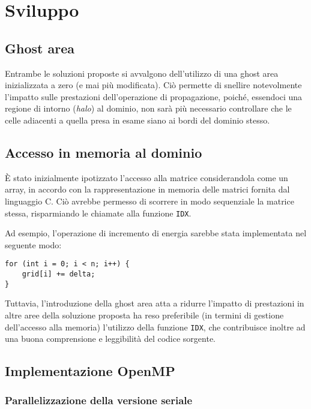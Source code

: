 \section{Sviluppo}

\subsection{Ghost area}

Entrambe le soluzioni proposte si avvalgono dell'utilizzo di una ghost area
inizializzata a zero (e mai più modificata).
Ciò permette di snellire notevolmente l'impatto sulle prestazioni
dell'operazione di propagazione, poiché, essendoci una regione di intorno
(\textit{halo}) al dominio, non sarà più necessario controllare che le celle
adiacenti a quella presa in esame siano ai bordi del dominio stesso.

\subsection{Accesso in memoria al dominio}

È stato inizialmente ipotizzato l'accesso alla matrice considerandola come un
array, in accordo con la rappresentazione in memoria delle matrici fornita dal
linguaggio C.
Ciò avrebbe permesso di scorrere in modo sequenziale la matrice stessa,
risparmiando le chiamate alla funzione \texttt{IDX}.

Ad esempio, l'operazione di incremento di energia sarebbe stata implementata nel
seguente modo:
\begin{verbatim}
for (int i = 0; i < n; i++) {
    grid[i] += delta;
}
\end{verbatim}

Tuttavia, l'introduzione della ghost area atta a ridurre l'impatto di
prestazioni in altre aree della soluzione proposta ha reso preferibile (in
termini di gestione dell'accesso alla memoria) l'utilizzo della funzione
\texttt{IDX}, che contribuisce inoltre ad una buona comprensione e leggibilità
del codice sorgente.

\subsection{Implementazione OpenMP}

\subsubsection{Parallelizzazione della versione seriale}

